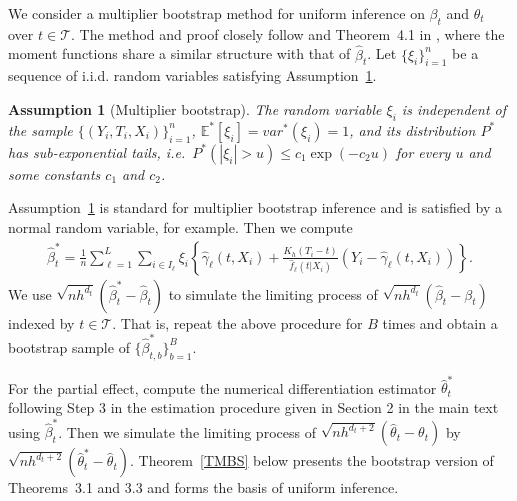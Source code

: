 \documentclass[lettersize, 12pt]{article}
\newtheorem{assumption}{Assumption}
\begin{document}
{%
We consider a multiplier bootstrap method for uniform inference on $\beta_t$ and $\theta_t$ over $t \in\mathcal{T}$.
The method and proof closely follow \cite{SUZ} and Theorem~4.1 in \cite{Fan}, where the moment functions share a similar structure with that of $\hat \beta_t$.
Let $\{\xi_i\}_{i=1}^n$ be a sequence of i.i.d. random variables satisfying Assumption~\ref{AMBS}.
\begin{assumption}[Multiplier bootstrap]
The random variable $\xi_i$ is independent of the sample $\{(Y_i, T_i, X_i)\}_{i=1}^n$, $\mathbb{E}^\ast[\xi_i] = var^\ast(\xi_i) = 1$, and its distribution $P^\ast$ has sub-exponential tails, i.e.\ $P^\ast(|\xi_i| > u) \leq c_1 \exp(-c_2 u)$ for every $u$ and some constants $c_1$ and $c_2$.
\label{AMBS}
\end{assumption}
Assumption~\ref{AMBS} is standard for multiplier bootstrap inference and is satisfied by a normal random variable, for example.
Then we compute
\begin{align*}
\hat \beta_t^\ast = \frac{1}{n}\sum_{\ell=1}^L \sum_{i \in I_\ell} \xi_i \left\{ \hat \gamma_\ell (t, X_i) + \frac{K_h(T_i - t)}{ \hat f_\ell(t|X_i)} \left( Y_i - \hat \gamma_\ell(t,X_i) \right)\right\}.
\end{align*}
We use $\sqrt{nh^{d_t}}(\hat\beta_t^\ast-\hat\beta_t)$ to simulate the limiting process of $\sqrt{nh^{d_t}}(\hat\beta_t-\beta_t)$ indexed by $t\in\mathcal{T}$.
That is, repeat the above procedure for $B$ times and obtain a bootstrap sample of $\{\hat\beta^\ast_{t,b}\}_{b=1}^B$.

For the partial effect, compute the numerical differentiation estimator $\hat\theta_t^\ast$ following Step 3 in the estimation procedure given in Section 2 in the main text using $\hat\beta_t^\ast$.
Then we simulate the limiting process of $\sqrt{nh^{d_t+2}}(\hat\theta_t-\theta_t)$ by $\sqrt{nh^{d_t+2}}(\hat\theta_t^\ast-\hat\theta_t)$. 
Theorem~\ref{TMBS} below 
presents the bootstrap version of Theorems~3.1 and 3.3 and forms the basis of uniform inference.

}
\end{document}
